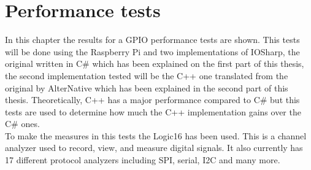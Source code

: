 \chapter{Performance tests}\label{S:Performance-Test}
In this chapter the results for a GPIO performance tests are shown. This tests will be done using the Raspberry Pi and two implementations of IOSharp, the original written in C\# which has been explained on the first part of this thesis, the second implementation tested will be the C++ one translated from the original by AlterNative which has been explained in the second part of this thesis. Theoretically, C++ has a major performance compared to C\# but this tests are used to determine how much the C++ implementation gains over the C\# ones.
\\
To make the measures in this tests the Logic16 has been used. This is a channel analyzer used to record, view, and measure digital signals. It also currently has 17 different protocol analyzers including SPI, serial, I2C and many more.

